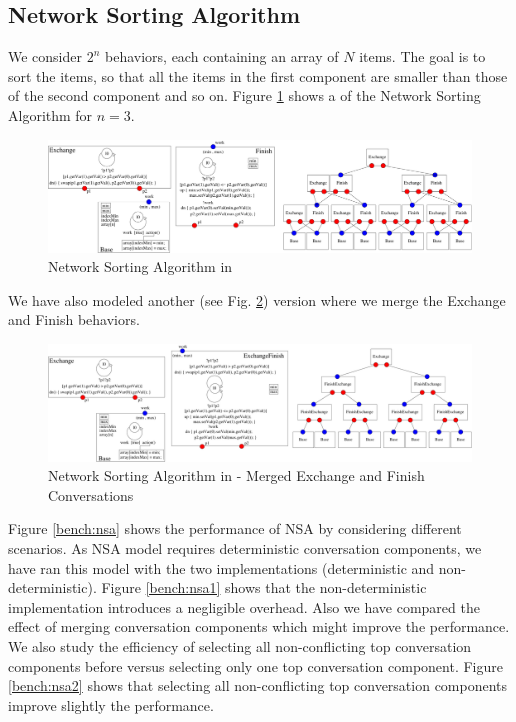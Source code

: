 \subsection{Network Sorting Algorithm}
\label{subsec:nsa}
We consider $2^n$ behaviors, each containing an array of $N$ items. The goal is to sort the items, so that all the items in the first component are smaller than those of the second component and so on. Figure \ref{fig:nsa1} shows a {\compmodel} of the Network Sorting Algorithm for $n=3$.
\begin{figure}
\centering
\includegraphics[scale=0.4]{fig/nsav1.pdf}
\caption{Network Sorting Algorithm in {\compmodel}}\label{fig:nsa1}
\end{figure} 
We have also modeled another (see Fig. \ref{fig:nsa2}) version where we merge the Exchange and Finish behaviors. 

\begin{figure}
\centering
\includegraphics[scale=0.4]{fig/nsav2.pdf}
\caption{Network Sorting Algorithm in {\compmodel} - Merged Exchange and Finish Conversations}\label{fig:nsa2}
\end{figure}


Figure \ref{bench:nsa} shows the performance of NSA by considering different scenarios. As NSA model requires deterministic conversation components, we have ran this model with the two implementations (deterministic and non-deterministic). Figure \ref{bench:nsa1} shows that the non-deterministic implementation introduces a negligible overhead. Also we have compared the effect of merging conversation components which might improve the performance. 
We also study the efficiency of selecting all non-conflicting top conversation components before versus selecting only one top conversation component. Figure \ref{bench:nsa2} shows that selecting all non-conflicting top conversation components improve slightly the performance. 



